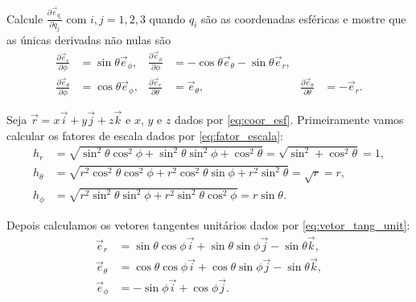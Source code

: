 \documentclass[a4paper,12pt, leqno, answers]{exam}
\newcommand{\devp}[2]{\frac{\partial #1}{\partial #2}}
\begin{document}
\begin{questions}
    \question Calcule $\devp{\vec{e}_{q_i}}{q_j}$ com $i, j = 1, 2, 3$ quando $q_i$ s\~{a}o as coordenadas esf\'{e}ricas e mostre que as únicas derivadas n\~{a}o nulas s\~{a}o
    \begin{align*}
        \devp{\vec{e}_r}{\phi} &= \sin \theta \vec{e}_\phi, &
        \devp{\vec{e}_\phi}{\phi} &= -\cos \theta \vec{e}_\theta - \sin \theta \vec{e}_r, \\
        \devp{\vec{e}_\theta}{\phi} &= \cos \theta \vec{e}_\phi, &
        \devp{\vec{e}_r}{\theta} &= \vec{e}_\theta, &
        \devp{\vec{e}_\theta}{\theta} &= -\vec{e}_r.
    \end{align*}
    \begin{solution}
        Seja $\vec{r} = x \vec{i} + y \vec{j} + z \vec{k}$ e $x$, $y$ e $z$ dados por \eqref{eq:coor_esf}. Primeiramente vamos calcular os fatores de escala dados por \eqref{eq:fator_escala}:
        \begin{align*}
            h_r &= \sqrt{\sin^2 \theta \cos^2 \phi + \sin^2 \theta \sin^2 \phi + \cos^2 \theta} = \sqrt{\sin^2  + \cos^2 \theta} = 1, \\
            h_\theta &= \sqrt{r^2 \cos^2 \theta \cos^2 \phi + r^2 \cos^2 \theta \sin \phi + r^2 \sin^2 \theta} = \sqrt{r} = r, \\
            h_\phi &= \sqrt{r^2 \sin^2 \theta \sin^2 \phi + r^2 \sin^2 \theta \cos^2 \phi} = r \sin \theta.
        \end{align*}
  
        Depois calculamos os vetores tangentes unit\'{a}rios dados por \eqref{eq:vetor_tang_unit}:
        \begin{align*}
            \vec{e}_r &= \sin \theta \cos \phi \vec{i} + \sin \theta \sin \phi \vec{j} - \sin \theta \vec{k}, \\
            \vec{e}_\theta &= \cos \theta \cos \phi \vec{i} + \cos \theta \sin \phi \vec{j} - \sin \theta \vec{k}, \\
            \vec{e}_\phi &= - \sin \phi \vec{i} + \cos \phi \vec{j}.
        \end{align*}
  

\end{solution}
\end{questions}
\end{document}

